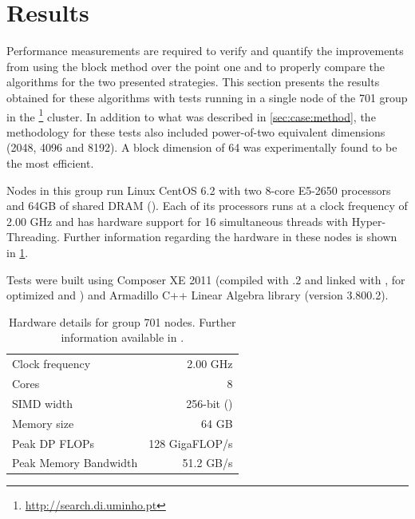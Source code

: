 \documentclass[../thesis]{subfiles}
\begin{document}
	\section{Results}
	\label{sec:multicore:results}

	Performance measurements are required to verify and quantify the improvements from using the block method over the point one and to properly compare the algorithms for the two presented strategies. This section presents the results obtained for these algorithms with tests running in a single node of the 701 group in the \search\footnote{\url{http://search.di.uminho.pt}} cluster. In addition to what was described in \cref{sec:case:method}, the methodology for these tests also included power-of-two equivalent dimensions (2048, 4096 and 8192). A block dimension of 64 was experimentally found to be the most efficient.

	Nodes in this group run Linux CentOS 6.2 with two 8-core \intel\xeon E5-2650 processors and 64GB of shared DRAM (\numa). Each of its processors runs at a clock frequency of 2.00 GHz and has hardware support for 16 simultaneous threads with \intel Hyper-Threading. Further information regarding the hardware in these nodes is shown in \cref{tab:search:701}.

	Tests were built using \intel Composer XE 2011 (compiled with .2 and linked with \intel\mkl, for optimized \blas and \lapack) and Armadillo C++ Linear Algebra library (version 3.800.2).

	\begin{table}[!htp]
		\begin{center}
			\begin{tabular}{lr}
				\hline
				Clock frequency & 2.00 GHz \\
				Cores & 8 \\
				SIMD width & 256-bit (\avx) \\
				Memory size & 64 GB \\
				\hline
				Peak DP FLOPs & 128 GigaFLOP/s \\
				Peak Memory Bandwidth & 51.2 GB/s \\ 
				\hline
			\end{tabular}
		\end{center}
		\caption{Hardware details for \search group 701 nodes. Further information available in \cite{Intel:Xeon:e5_2650,Intel:Xeon:e5_2600}.}
		\label{tab:search:701}
	\end{table}
\end{document}
